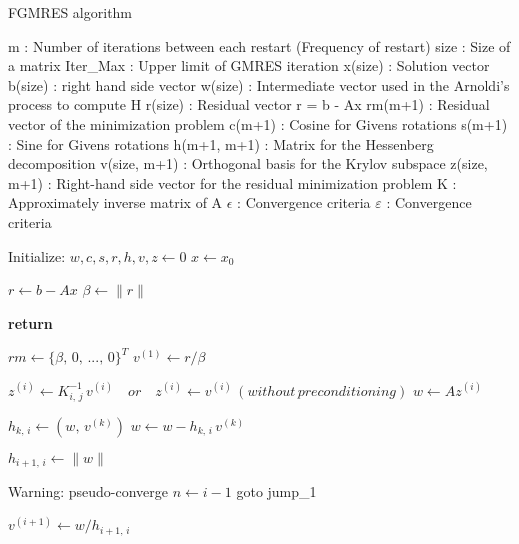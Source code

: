 %
\begin{algorithm}
\caption{FGMRES algorithm}
\label{algo:fgmres}

\begin{algorithmic}
\State m             : Number of iterations between each restart (Frequency of restart)
\State size          : Size of a matrix
\State Iter\_Max     : Upper limit of GMRES iteration
\State x(size)       : Solution vector
\State b(size)       : right hand side vector
\State w(size)       : Intermediate vector used in the Arnoldi's process to compute H
\State r(size)       : Residual vector r = b - Ax
\State rm(m+1)       : Residual vector of the minimization problem
\State c(m+1)        : Cosine for Givens rotations
\State s(m+1)        : Sine for Givens rotations
\State h(m+1, m+1)   : Matrix for the Hessenberg decomposition
\State v(size, m+1)  : Orthogonal basis for the Krylov subspace
\State z(size, m+1)  : Right-hand side vector for the residual minimization problem
\State K             : Approximately inverse matrix of A
\State $\epsilon$    : Convergence criteria
\State $\varepsilon$ : Convergence criteria
\State 

\State Initialize: $w,c,s,r,h,v,z \gets 0$
\State $x \gets x_0$
\State


\State $r \gets b - Ax$
\State $\beta \gets \|r\|$

\State \bf{return}
\EndIf

\State $rm \gets \{\beta,\,0,\,...,\,0\}^T$
\State $v^{(1)} \gets r / \beta$
\State

\State $z^{(i)} \gets K^{-1}_{i,\,j}\, v^{(i)} \quad or \quad z^{(i)} \gets v^{(i)}\,(without\, preconditioning)$
\State $w \gets A z^{(i)}$

\State $h_{k,\,i} \gets (w,\,v^{(k)})$
\State $w \gets w - h_{k,\,i}\,v^{(k)}$
\EndFor

\State $h_{i+1,\,i} \gets \|w\|$
\State

\State Warning: pseudo-converge
\State $n \gets i-1$
\State goto jump\_1
\EndIf
\State

\State $v^{(i+1)} \gets w / h_{i+1,\,i}$

\end{algorithmic}

\end{algorithm}

